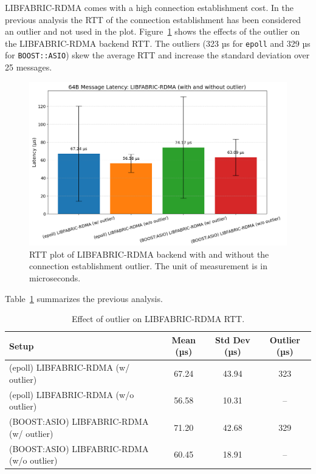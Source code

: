 LIBFABRIC-RDMA comes with a high connection establishment cost. In the previous analysis the \acs{RTT} of the connection establishment has been considered an outlier and not used in the plot. Figure~\ref{fig:rtt-rdma-outlier} shows the effects of the outlier on the LIBFABRIC-RDMA backend \acs{RTT}. The outliers (323 µs for \texttt{epoll} and 329 µs for \texttt{BOOST::ASIO}) skew the average \acs{RTT} and increase the standard deviation over 25 messages.

\begin{figure}[htbp]
\centering
\includegraphics[width=\textwidth]{images/results/rtt-RDMA-outliers.png}
\caption[RDMA RTT plot, with outliers]{RTT plot of LIBFABRIC-RDMA backend with and without the connection establishment outlier. The unit of measurement is in microseconds.}
\label{fig:rtt-rdma-outlier}
\end{figure}

Table~\ref{tab:rtt-outlier} summarizes the previous analysis.

\begin{table}[ht]
\centering
\begin{tabular}{|l|c|c|c|}
\hline
\textbf{Setup} & \textbf{Mean (µs)} & \textbf{Std Dev (µs)} & \textbf{Outlier (µs)} \\
\hline
(epoll) LIBFABRIC-RDMA (w/ outlier) & 67.24 & 43.94 & 323 \\
(epoll) LIBFABRIC-RDMA (w/o outlier) & 56.58 & 10.31 & -- \\
(BOOST:ASIO) LIBFABRIC-RDMA (w/ outlier) & 71.20 & 42.68 & 329 \\
(BOOST:ASIO) LIBFABRIC-RDMA (w/o outlier) & 60.45 & 18.91 & -- \\
\hline
\end{tabular}
\caption{Effect of outlier on LIBFABRIC-RDMA RTT.}
\label{tab:rtt-outlier}
\end{table}

